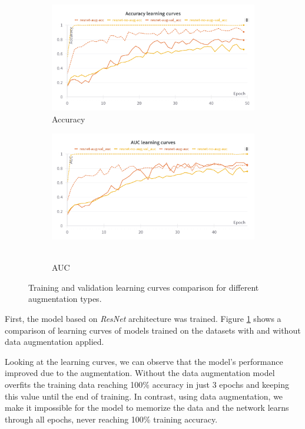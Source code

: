 \begin{figure}[!htb]
    \centering
    \begin{subfigure}{0.8\textwidth}
        \includegraphics[width=\textwidth]{Images/gtzan_plots/lc/resnet_acc_lc.png}
        \caption{Accuracy}
    \end{subfigure}
    \vspace{0.3cm}
    \begin{subfigure}{0.8\textwidth}
        \includegraphics[width=\textwidth]{Images/gtzan_plots/lc/resnet_auc_lc.png}\
        \caption{AUC}
    \end{subfigure}
    \vspace{0.3cm}
    \caption{Training and validation learning curves comparison for different augmentation types.}
    \label{fig:GTZANLearningCurves}
\end{figure}

First, the model based on \textit{ResNet} architecture was trained. Figure \ref{fig:GTZANLearningCurves} shows a comparison of learning curves of models trained on the datasets with and without data augmentation applied.

Looking at the learning curves, we can observe that the model's performance improved due to the augmentation.
Without the data augmentation model overfits the training data reaching 100\% accuracy in just 3 epochs and keeping this value until the end of training. In contrast, using data augmentation, we make it impossible for the model to memorize the data and the network learns through all epochs, never reaching 100\% training accuracy.

